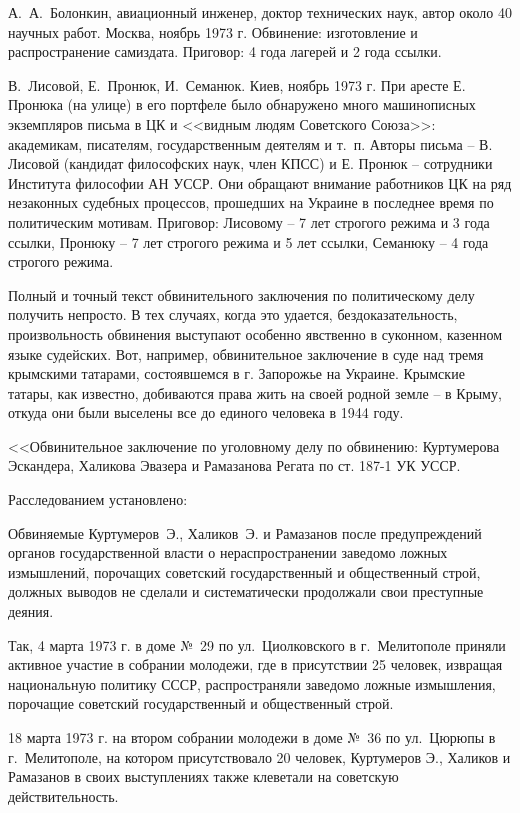 \documentclass{book}
\begin{document}
А.~А.~Болонкин, авиационный инженер, доктор технических наук, автор около 40 научных работ. Москва, ноябрь 1973 г. Обвинение: изготовление и распространение самиздата. Приговор: 4 года лагерей и 2 года ссылки.

В.~Лисовой, Е.~Пронюк, И.~Семанюк. Киев, ноябрь 1973 г. При аресте Е. Пронюка (на улице) в его портфеле было обнаружено много машинописных экземпляров письма в ЦК и <<видным людям Советского Союза>>: академикам, писателям, государственным деятелям и т.~п. Авторы письма -- В. Лисовой (кандидат философских наук, член КПСС) и Е. Пронюк -- сотрудники Института философии АН УССР. Они обращают внимание работников ЦК на ряд незаконных судебных про­цессов, прошедших на Украине в последнее время по политическим мотивам. Приговор: Лисовому -- 7 лет строгого режи­ма и 3 года ссылки, Пронюку -- 7 лет строгого режима и 5 лет ссылки, Семанюку -- 4 года строгого режима.

Полный и точный текст обвинительного заключения по политическому делу получить непросто. В тех случаях, когда это удается, бездоказательность, произвольность обвинения выступают особенно явственно в суконном, казенном языке судейских. Вот, например, обвинительное заключение в суде над тремя крымскими татарами, состоявшемся в г. Запорожье на Украине. Крымские татары, как известно, добиваются права жить на своей родной земле -- в Крыму, откуда они были выселены все до единого человека в 1944 году.

<<Обвинительное заключение по уголовному делу по обвинению: Куртумерова Эскандера, Халикова Эвазера и Рамазанова Регата по ст. 187-1 УК УССР.

Расследованием установлено:

Обвиняемые Куртумеров~Э., Халиков~Э. и Рамазанов после предупреждений органов государственной власти о нераспространении заведомо ложных измышлений, порочащих советский государственный и общественный строй, должных выводов не сделали и систематически продолжали свои преступные деяния.

Так, 4 марта 1973 г. в доме №~29 по ул.~Циолковского в г.~Мелитополе приняли активное участие в собрании молодежи, где в присутствии 25 человек, извращая национальную политику СССР, распространяли заведомо ложные измышления, порочащие советский государственный и общественный строй.

18 марта 1973 г. на втором собрании молодежи в доме №~36 по ул.~Цюрюпы в г.~Мелитополе, на котором присутствовало 20 человек, Куртумеров Э., Халиков и Рамазанов в своих выступлениях также клеветали на советскую действительность.
\end{document}
